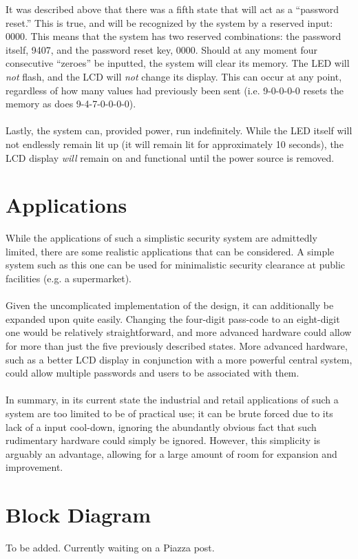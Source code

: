 \documentclass[10pt,a4paper]{article}
\begin{document}
\pagebreak
It was described above that there was a fifth state that will act as a ``password reset.'' This is true, and will be recognized by the system by a reserved input: 0000. This means that the system has two reserved combinations: the password itself, 9407, and the password reset key, 0000. Should at any moment four consecutive ``zeroes'' be inputted, the system will clear its memory. The LED will \textit{not} flash, and the LCD will \textit{not} change its display. This can occur at any point, regardless of how many values had previously been sent (i.e. 9-0-0-0-0 resets the memory as does 9-4-7-0-0-0-0).\\~\\
Lastly, the system can, provided power, run indefinitely. While the LED itself will not endlessly remain lit up (it will remain lit for approximately 10 seconds), the LCD display \textit{will} remain on and functional until the power source is removed.
\pagebreak
\section{Applications}
While the applications of such a simplistic security system are admittedly limited, there are some realistic applications that can be considered. A simple system such as this one can be used for minimalistic security clearance at public facilities (e.g. a supermarket). \\~\\
Given the uncomplicated implementation of the design, it can additionally be expanded upon quite easily. Changing the four-digit pass-code to an eight-digit one would be relatively straightforward, and more advanced hardware could allow for more than just the five previously described states. More advanced hardware, such as a better LCD display in conjunction with a more powerful central system, could allow multiple passwords and users to be associated with them. \\~\\
In summary, in its current state the industrial and retail applications of such a system are too limited to be of practical use; it can be brute forced due to its lack of a input cool-down, ignoring the abundantly obvious fact that such rudimentary hardware could simply be ignored. However, this simplicity is arguably an advantage, allowing for a large amount of room for expansion and improvement.
\pagebreak
\section{Block Diagram}
To be added. Currently waiting on a Piazza post.
\pagebreak
\end{document}
